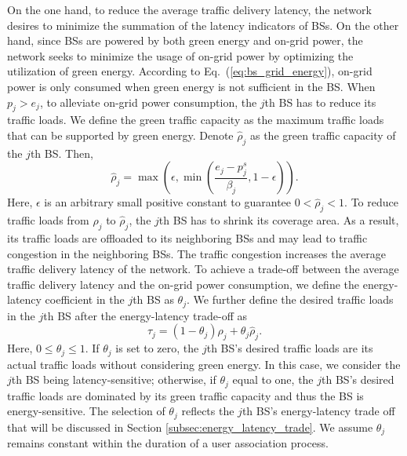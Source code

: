 \documentclass[journal]{IEEEtran}
\theoremstyle{definition}
\begin{document}
On the one hand, to reduce the average traffic delivery latency, the network desires to minimize the summation of the latency indicators of BSs. On the other hand, since BSs are powered by both green energy and on-grid power, the network seeks to minimize the usage of on-grid power by optimizing the utilization of green energy.
According to Eq.~(\ref{eq:bs_grid_energy}), on-grid power is only consumed when green energy is not sufficient in the BS. When $p_{j}>e_{j}$, to alleviate on-grid power consumption, the $j$th BS has to reduce its traffic loads. We define the green traffic capacity as the maximum traffic loads that can be supported by green energy. Denote $\hat{\rho}_j$ as the green traffic capacity of the $j$th BS. Then,
\begin{equation}
\label{eq:green_load}
\hat{\rho}_{j}=\max{(\epsilon,\min(\frac{e_{j}-p^{s}_{j}}{\beta_{j}},1-\epsilon))}.
\end{equation}
Here, $\epsilon$ is an arbitrary small positive constant to guarantee $0<\hat{\rho}_{j}<1$.
To reduce traffic loads from $\rho_{j}$ to $\hat{\rho}_{j}$, the $j$th BS has to shrink its coverage area. As a result, its traffic loads are offloaded to its neighboring BSs and may lead to traffic congestion in the neighboring BSs. The traffic congestion increases the average traffic delivery latency of the network. To achieve a trade-off between the average traffic delivery latency and the on-grid power consumption, we define the energy-latency coefficient in the $j$th BS as $\theta_{j}$. We further define the desired traffic loads in the $j$th BS after the energy-latency trade-off as
\begin{equation}
\label{eq:tradeoff_load}
\tau_{j}=(1-\theta_{j})\rho_{j}+\theta_{j}\hat{\rho}_{j}.
\end{equation}
Here, $0\leq \theta_{j} \leq 1$.
If $\theta_{j}$ is set to zero, the $j$th BS's desired traffic loads are its actual traffic loads without considering green energy. In this case, we consider the $j$th BS being latency-sensitive; otherwise, if $\theta_{j}$ equal to one, the $j$th BS's desired traffic loads are dominated by its green traffic capacity and thus the BS is energy-sensitive. The selection of $\theta_{j}$ reflects the $j$th BS's energy-latency trade off that will be discussed in Section \ref{subsec:energy_latency_trade}. We assume $\theta_{j}$ remains constant within the duration of a user association process.
\end{document}
